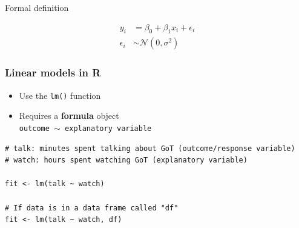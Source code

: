 \documentclass[pdf]{beamer}
\begin{document}
\begin{frame}{Formal definition}

$$
\begin{aligned}
y_i & = \beta_0 + \beta_1x_i + \epsilon_i \\
\epsilon_i & \sim \mathcal{N}(0, \sigma^2)
\end{aligned}
$$

\vfill


\vfill


\end{frame}

\begin{frame}[fragile]
\frametitle{Linear models in R}

\begin{itemize}\addtolength{\itemsep}{0.5\baselineskip}
    \item Use the \texttt{lm()} function
    \item Requires a \textbf{formula} object\\ \texttt{outcome $\sim$ explanatory variable}
\end{itemize}

\vfill

\begin{lstlisting}[style=R]
# talk: minutes spent talking about GoT (outcome/response variable)
# watch: hours spent watching GoT (explanatory variable) 

fit <- lm(talk ~ watch)

# If data is in a data frame called "df"
fit <- lm(talk ~ watch, df) 
\end{lstlisting}

\end{frame}
\end{document}
